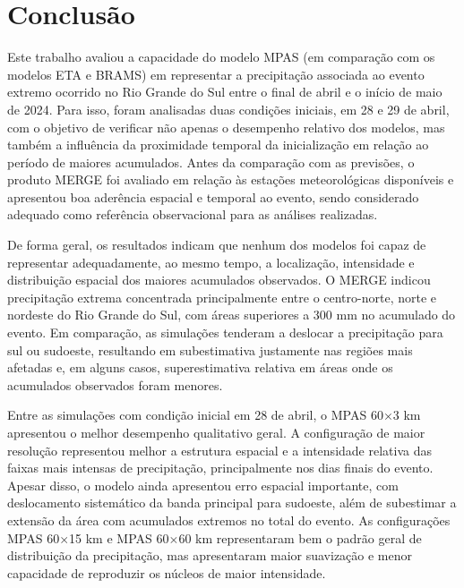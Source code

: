 \documentclass[12pt,a4paper,oneside]{book}
\begin{document}
\chapter{Conclusão}

Este trabalho avaliou a capacidade do modelo MPAS (em comparação com os modelos ETA e BRAMS) em representar a precipitação associada ao evento extremo ocorrido no Rio Grande do Sul entre o final de abril e o início de maio de 2024. Para isso, foram analisadas duas condições iniciais, em 28 e 29 de abril, com o objetivo de verificar não apenas o desempenho relativo dos modelos, mas também a influência da proximidade temporal da inicialização em relação ao período de maiores acumulados. Antes da comparação com as previsões, o produto MERGE foi avaliado em relação às estações meteorológicas disponíveis e apresentou boa aderência espacial e temporal ao evento, sendo considerado adequado como referência observacional para as análises realizadas.

De forma geral, os resultados indicam que nenhum dos modelos foi capaz de representar adequadamente, ao mesmo tempo, a localização, intensidade e distribuição espacial dos maiores acumulados observados. O MERGE indicou precipitação extrema concentrada principalmente entre o centro-norte, norte e nordeste do Rio Grande do Sul, com áreas superiores a 300 mm no acumulado do evento. Em comparação, as simulações tenderam a deslocar a precipitação para sul ou sudoeste, resultando em subestimativa justamente nas regiões mais afetadas e, em alguns casos, superestimativa relativa em áreas onde os acumulados observados foram menores.

Entre as simulações com condição inicial em 28 de abril, o MPAS 60$\times$3 km apresentou o melhor desempenho qualitativo geral. A configuração de maior resolução representou melhor a estrutura espacial e a intensidade relativa das faixas mais intensas de precipitação, principalmente nos dias finais do evento. Apesar disso, o modelo ainda apresentou erro espacial importante, com deslocamento sistemático da banda principal para sudoeste, além de subestimar a extensão da área com acumulados extremos no total do evento. As configurações MPAS 60$\times$15 km e MPAS 60$\times$60 km representaram bem o padrão geral de distribuição da precipitação, mas apresentaram maior suavização e menor capacidade de reproduzir os núcleos de maior intensidade.
\end{document}
